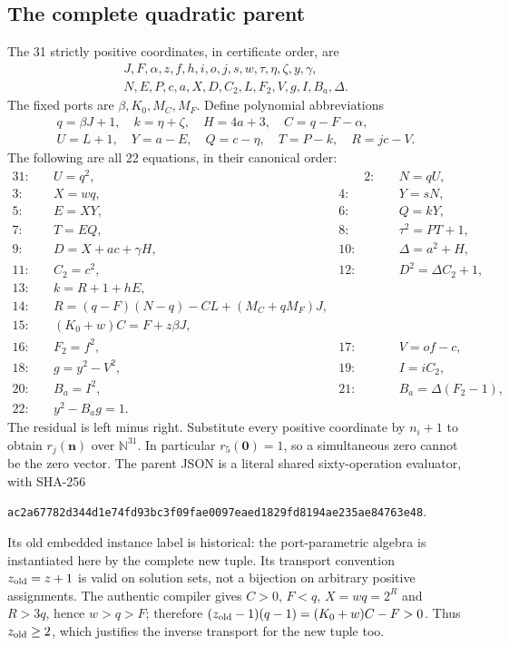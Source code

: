 \documentclass[11pt]{article}
\newcommand{\N}{\mathbb N}\newcommand{\Z}{\mathbb Z}
\begin{document}
\subsection{The complete quadratic parent}
The 31 strictly positive coordinates, in certificate order, are
\[
\begin{gathered}
J,F,\alpha,z,f,h,i,o,j,s,w,\tau,\eta,\zeta,y,\gamma,\\
N,E,P,c,a,X,D,C_2,L,F_2,V,g,I,B_a,\Delta.
\end{gathered}
\]
The fixed ports are $\beta,K_0,M_C,M_F$. Define polynomial abbreviations
\[
\begin{gathered}
q=\beta J+1,\quad k=\eta+\zeta,\quad H=4a+3,\quad C=q-F-\alpha,\\
U=L+1,\quad Y=a-E,\quad Q=c-\eta,\quad T=P-k,\quad R=jc-V.
\end{gathered}
\]
The following are all 22 equations, in their canonical order:
\begin{alignat*}{3}
1:\quad&U=q^2, &\qquad 2:\quad&N=qU,\\
3:\quad&X=wq, &4:\quad&Y=sN,\\
5:\quad&E=XY, &6:\quad&Q=kY,\\
7:\quad&T=EQ, &8:\quad&\tau^2=PT+1,\\
9:\quad&D=X+ac+\gamma H, &10:\quad&\Delta=a^2+H,\\
11:\quad&C_2=c^2, &12:\quad&D^2=\Delta C_2+1,\\
13:\quad&k=R+1+hE,&&\\
14:\quad&R=(q-F)(N-q)-CL+(M_C+qM_F)J,&&\\
15:\quad&(K_0+w)C=F+z\beta J,&&\\
16:\quad&F_2=f^2, &17:\quad&V=of-c,\\
18:\quad&g=y^2-V^2, &19:\quad&I=iC_2,\\
20:\quad&B_a=I^2, &21:\quad&B_a=\Delta(F_2-1),\\
22:\quad&y^2-B_ag=1.&&
\end{alignat*}
The residual is left minus right. Substitute every positive coordinate by
$n_i+1$ to obtain $r_j(\mathbf n)$ over $\N^{31}$. In particular
$r_5(\mathbf0)=1$, so a simultaneous zero cannot be the zero vector. The
parent JSON is a literal shared sixty-operation evaluator, with SHA-256
\begin{center}\small\texttt{ac2a67782d344d1e74fd93bc3f09fae0097eaed1829fd8194ae235ae84763e48}.\end{center}
Its old embedded instance label is historical: the port-parametric algebra
is instantiated here by the complete new tuple. Its transport convention
$z_{\rm old}=z+1$ is valid on solution sets, not a bijection on arbitrary
positive assignments. The authentic compiler gives $C>0$, $F<q$,
$X=wq=2^R$ and $R>3q$, hence $w>q>F$; therefore
$(z_{\rm old}-1)(q-1)=(K_0+w)C-F>0$. Thus $z_{\rm old}\ge2$, which
justifies the inverse transport for the new tuple too.
\end{document}
